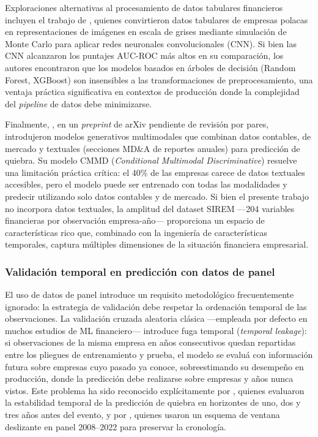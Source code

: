 \documentclass[12pt, letterpaper]{article}
\begin{document}
Exploraciones alternativas al procesamiento de datos tabulares financieros incluyen el trabajo de \citet{DzikWalczak2021}, quienes convirtieron datos tabulares de empresas polacas en representaciones de im\'agenes en escala de grises mediante simulaci\'on de Monte Carlo para aplicar redes neuronales convolucionales (CNN). Si bien las CNN alcanzaron los puntajes AUC-ROC m\'as altos en su comparaci\'on, los autores encontraron que los modelos basados en \'arboles de decisi\'on (Random Forest, XGBoost) son insensibles a las transformaciones de preprocesamiento, una ventaja pr\'actica significativa en contextos de producci\'on donde la complejidad del \textit{pipeline} de datos debe minimizarse.

Finalmente, \citet{Mancisidor2024}, en un \textit{preprint} de arXiv pendiente de revisi\'on por pares, introdujeron modelos generativos multimodales que combinan datos contables, de mercado y textuales (secciones MD\&A de reportes anuales) para predicci\'on de quiebra. Su modelo CMMD (\textit{Conditional Multimodal Discriminative}) resuelve una limitaci\'on pr\'actica cr\'itica: el 40\% de las empresas carece de datos textuales accesibles, pero el modelo puede ser entrenado con todas las modalidades y predecir utilizando solo datos contables y de mercado. Si bien el presente trabajo no incorpora datos textuales, la amplitud del dataset SIREM ---204 variables financieras por observaci\'on empresa-a\~no--- proporciona un espacio de caracter\'isticas rico que, combinado con la ingenier\'ia de caracter\'isticas temporales, captura m\'ultiples dimensiones de la situaci\'on financiera empresarial.

\subsubsection{Validaci\'on temporal en predicci\'on con datos de panel}
\label{sec:validacion-temporal}

El uso de datos de panel introduce un requisito metodol\'ogico frecuentemente ignorado: la estrategia de validaci\'on debe respetar la ordenaci\'on temporal de las observaciones. La validaci\'on cruzada aleatoria cl\'asica ---empleada por defecto en muchos estudios de ML financiero--- introduce fuga temporal (\textit{temporal leakage}): si observaciones de la misma empresa en a\~nos consecutivos quedan repartidas entre los pliegues de entrenamiento y prueba, el modelo se evalu\'a con informaci\'on futura sobre empresas cuyo pasado ya conoce, sobreestimando su desempe\~no en producci\'on, donde la predicci\'on debe realizarse sobre empresas y a\~nos nunca vistos. Este problema ha sido reconocido expl\'icitamente por \citet{Bortolotti2024}, quienes evaluaron la estabilidad temporal de la predicci\'on de quiebra en horizontes de uno, dos y tres a\~nos antes del evento, y por \citet{Mahesh2025}, quienes usaron un esquema de ventana deslizante en panel 2008--2022 para preservar la cronolog\'ia.
\end{document}
